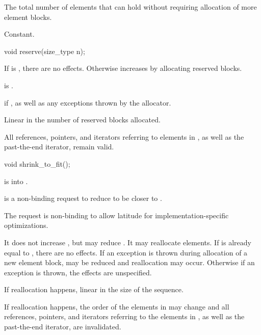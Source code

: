 \begin{itemdescr}
\pnum
\returns
The total number of elements that  can hold
without requiring allocation of more element blocks.

\pnum
\complexity
Constant.
\end{itemdescr}

%
\begin{itemdecl}
void reserve(size_type n);
\end{itemdecl}

\begin{itemdescr}
\pnum
\effects
If  is , there are no effects.
Otherwise increases  by allocating reserved blocks.

\pnum
\ensures
{} is .

\pnum
\throws
{} if ,
as well as any exceptions thrown by the allocator.

\pnum
\complexity
Linear in the number of reserved blocks allocated.

\pnum
\remarks
All references, pointers, and iterators referring to elements in ,
as well as the past-the-end iterator, remain valid.
\end{itemdescr}

%
\begin{itemdecl}
void shrink_to_fit();
\end{itemdecl}

\begin{itemdescr}
\pnum
\expects
{} is  into .

\pnum
\effects
{} is a non-binding request
to reduce  to be closer to .
\begin{note}
The request is non-binding
to allow latitude for implementation-specific optimizations.
\end{note}
It does not increase , but may reduce .
It may reallocate elements.
If  is already equal to , there are no effects.
If an exception is thrown during allocation of a new element block,
 may be reduced and reallocation may occur.
Otherwise if an exception is thrown, the effects are unspecified.

\pnum
\complexity
If reallocation happens, linear in the size of the sequence.

\pnum
\remarks
If reallocation happens,
the order of the elements in  may change and
all references, pointers, and iterators
referring to the elements in ,
as well as the past-the-end iterator, are invalidated.
\end{itemdescr}

